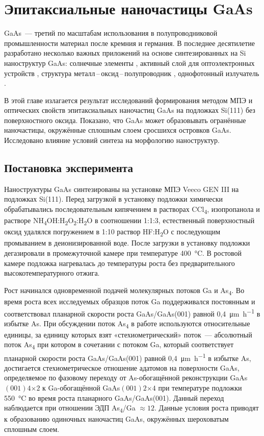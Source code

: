 \chapter{Эпитаксиальные наночастицы GaAs}\label{ch:ch5}

GaAs~--- третий по масштабам использования в полупроводниковой промышленности
материал после кремния и германия. В последнее десятилетие разработано
несколько важных приложений на основе синтезированных на Si наноструктур GaAs:
солнечные элементы \cite{Chu2014}, активный слой для оптоэлектронных устройств
\cite{Bietti2009}, структура металл\,--\,оксид\,--\,полупроводник
\cite{Zhao2009}, однофотонный излучатель \cite{Sanguinetti2015}.

В этой главе излагается результат исследований формирования методом МПЭ и
оптических свойств эпитаксиальных наночастиц GaAs на подложках Si(111) без
поверхностного оксида. Показано, что GaAs может образовывать огранённые
наночастицы, окружённые сплошным слоем сросшихся островков GaAs. Исследовано
влияние условий синтеза на морфологию наноструктур.

\section{Постановка эксперимента}\label{sec:ch5/sec1}

Наноструктуры GaAs синтезированы на установке МПЭ Veeco GEN III на подложках
Si(111). Перед загрузкой в установку подложки химически обрабатывались
последовательным кипячением в растворах CCl\textsubscript{4}, изопропанола и
растворе
NH\textsubscript{4}OH:H\textsubscript{2}O\textsubscript{2}:H\textsubscript{2}O
в соотношении 1:1:3, естественный поверхностный оксид удалялся погружением в
1:10 раствор HF:H\textsubscript{2}O с последующим промыванием в
деионизированной воде. После загрузки в установку подложки дегазировали в
промежуточной камере при температуре 400~\si{\degreeCelsius}. В ростовой камере
подложка нагревалась до температуры роста без предварительного
высокотемпературного отжига.

Рост начинался одновременной подачей молекулярных потоков Ga и
As\textsubscript{4}. Во время роста всех исследуемых образцов поток Ga
поддерживался постоянным и соответствовал планарной скорости роста
GaAs/GaAs(001) равной 0,4~\si{\micro\metre\per\hour} в избытке As. При
обсуждении поток As\textsubscript{4} в работе используются относительные
единицы, за единицу которых взят «стехиометрический» поток~--- абсолютный поток
As\textsubscript{4} при котором в сочетании с потоком Ga, который соответствует
планарной скорости роста GaAs/GaAs(001) равной 0,4~\si{\micro\metre\per\hour} в
избытке As, достигается стехиометрическое отношение адатомов на поверхности
GaAs, определяемое по фазовому переходу от As-обогащённой реконструкции
GaAs\((001)4\)\(\times\)\(2\) к Ga-обогащённой GaAs\((001)2\)\(\times\)\(4\)
при температуре подложки 550~\si{\degreeCelsius} во время роста планарного
GaAs/GaAs(001). Данный переход наблюдается при отношении ЭДП
As\textsubscript{4}/Ga \(\approx 12\). Данные условия роста приводят к
образованию одиночных наночастиц GaAs, окружённых шероховатым сплошным слоем.

